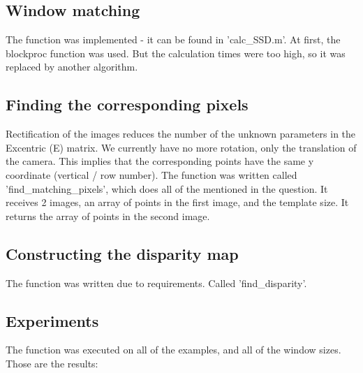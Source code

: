 \documentclass[a4paper]{iacas}
\begin{document}
\subsection{Window matching}
The function was implemented - it can be found in 'calc\_SSD.m'. At first, the blockproc function was used. But the calculation times were too high, so it was replaced by another algorithm.


\subsection{Finding the corresponding pixels}
Rectification of the images reduces the number of the unknown parameters in the Excentric (E) matrix. We currently have no more rotation, only the translation of the camera. This implies that the corresponding points have the same y coordinate (vertical / row number).
\newline
The function was written called 'find\_matching\_pixels', which does all of the mentioned in the question. It receives 2 images, an array of points in the first image, and the template size. It returns the array of points in the second image.

\subsection{Constructing the disparity map}
The function was written due to requirements. Called 'find\_disparity'.


\subsection{Experiments}
The function was executed on all of the examples, and all of the window sizes. Those are the results:


\end{document}
